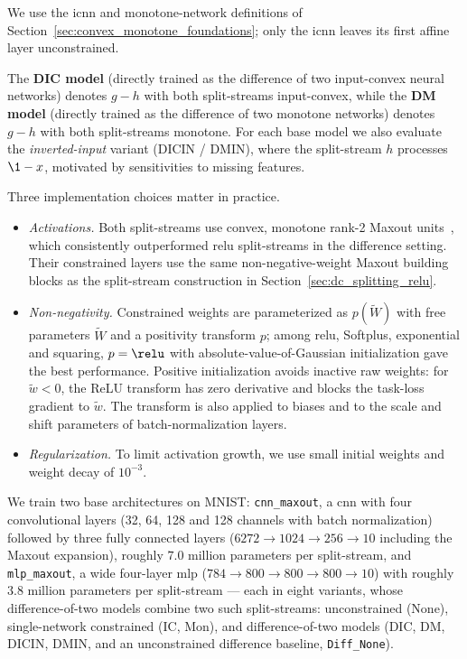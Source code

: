 We use the \ac{icnn} and monotone-network definitions of Section~\ref{sec:convex_monotone_foundations}; only the \ac{icnn} leaves its first affine layer unconstrained.

The \textbf{DIC model} (directly trained as the difference of two input-convex neural networks) denotes $g-h$ with both split-streams input-convex, while the \textbf{DM model} (directly trained as the difference of two monotone networks) denotes $g-h$ with both split-streams monotone. For each base model we also evaluate the \emph{inverted-input} variant (DICIN / DMIN), where the split-stream $h$ processes $\1-x$, motivated by sensitivities to missing features.

Three implementation choices matter in practice.
\begin{itemize}
	\item \emph{Activations.} Both split-streams use convex, monotone rank-2 Maxout units~\parencite{Goodfellow2013Maxout}, which consistently outperformed \ac{relu} split-streams in the difference setting. Their constrained layers use the same non-negative-weight Maxout building blocks as the split-stream construction in Section~\ref{sec:dc_splitting_relu}.
	\item \emph{Non-negativity.} Constrained weights are parameterized as $p(\tilde{W})$ with free parameters $\tilde{W}$ and a positivity transform $p$; among \ac{relu}, Softplus, exponential and squaring, $p = \relu$ with absolute-value-of-Gaussian initialization gave the best performance. Positive initialization avoids inactive raw weights: for $\tilde w<0$, the ReLU transform has zero derivative and blocks the task-loss gradient to $\tilde w$. The transform is also applied to biases and to the scale and shift parameters of batch-normalization layers.
	\item \emph{Regularization.} To limit activation growth, we use small initial weights and weight decay of $10^{-3}$.
\end{itemize}

We train two base architectures on MNIST: \texttt{cnn\_maxout}, a \ac{cnn} with four convolutional layers (32, 64, 128 and 128 channels with batch normalization) followed by three fully connected layers ($6272 \to 1024 \to 256 \to 10$ including the Maxout expansion), roughly $7.0$ million parameters per split-stream, and \texttt{mlp\_maxout}, a wide four-layer \ac{mlp} ($784 \to 800 \to 800 \to 800 \to 10$) with roughly $3.8$ million parameters per split-stream --- each in eight variants, whose difference-of-two models combine two such split-streams: unconstrained (None), single-network constrained (IC, Mon), and difference-of-two models (DIC, DM, DICIN, DMIN, and an unconstrained difference baseline, \texttt{Diff\_None}).

